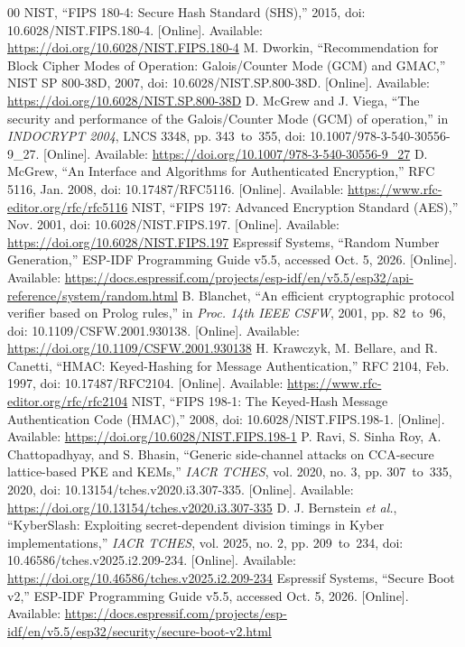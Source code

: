 \documentclass[journal, 10pt]{IEEEtran}
\begin{document}
\begin{thebibliography}{00}
 NIST, ``FIPS 180-4: Secure Hash Standard (SHS),'' 2015, doi: 10.6028/NIST.FIPS.180-4. [Online]. Available: \url{https://doi.org/10.6028/NIST.FIPS.180-4}
 M. Dworkin, ``Recommendation for Block Cipher Modes of Operation: Galois/Counter Mode (GCM) and GMAC,'' NIST SP 800-38D, 2007, doi: 10.6028/NIST.SP.800-38D. [Online]. Available: \url{https://doi.org/10.6028/NIST.SP.800-38D}
 D. McGrew and J. Viega, ``The security and performance of the Galois/Counter Mode (GCM) of operation,'' in \textit{INDOCRYPT 2004}, LNCS 3348, pp. 343~to~355, doi: 10.1007/978-3-540-30556-9\_27. [Online]. Available: \url{https://doi.org/10.1007/978-3-540-30556-9_27}
 D. McGrew, ``An Interface and Algorithms for Authenticated Encryption,'' RFC 5116, Jan. 2008, doi: 10.17487/RFC5116. [Online]. Available: \url{https://www.rfc-editor.org/rfc/rfc5116}
 NIST, ``FIPS 197: Advanced Encryption Standard (AES),'' Nov. 2001, doi: 10.6028/NIST.FIPS.197. [Online]. Available: \url{https://doi.org/10.6028/NIST.FIPS.197}
 Espressif Systems, ``Random Number Generation,'' ESP-IDF Programming Guide v5.5, accessed Oct. 5, 2026. [Online]. Available: \url{https://docs.espressif.com/projects/esp-idf/en/v5.5/esp32/api-reference/system/random.html}
 B. Blanchet, ``An efficient cryptographic protocol verifier based on Prolog rules,'' in \textit{Proc. 14th IEEE CSFW}, 2001, pp. 82~to~96, doi: 10.1109/CSFW.2001.930138. [Online]. Available: \url{https://doi.org/10.1109/CSFW.2001.930138}
 H. Krawczyk, M. Bellare, and R. Canetti, ``HMAC: Keyed-Hashing for Message Authentication,'' RFC 2104, Feb. 1997, doi: 10.17487/RFC2104. [Online]. Available: \url{https://www.rfc-editor.org/rfc/rfc2104}
 NIST, ``FIPS 198-1: The Keyed-Hash Message Authentication Code (HMAC),'' 2008, doi: 10.6028/NIST.FIPS.198-1. [Online]. Available: \url{https://doi.org/10.6028/NIST.FIPS.198-1}
 P. Ravi, S. Sinha Roy, A. Chattopadhyay, and S. Bhasin, ``Generic side-channel attacks on CCA-secure lattice-based PKE and KEMs,'' \textit{IACR TCHES}, vol. 2020, no. 3, pp. 307~to~335, 2020, doi: 10.13154/tches.v2020.i3.307-335. [Online]. Available: \url{https://doi.org/10.13154/tches.v2020.i3.307-335}
 D. J. Bernstein \textit{et al.}, ``KyberSlash: Exploiting secret-dependent division timings in Kyber implementations,'' \textit{IACR TCHES}, vol. 2025, no. 2, pp. 209~to~234, doi: 10.46586/tches.v2025.i2.209-234. [Online]. Available: \url{https://doi.org/10.46586/tches.v2025.i2.209-234}
 Espressif Systems, ``Secure Boot v2,'' ESP-IDF Programming Guide v5.5, accessed Oct. 5, 2026. [Online]. Available: \url{https://docs.espressif.com/projects/esp-idf/en/v5.5/esp32/security/secure-boot-v2.html}

\end{thebibliography}
\end{document}
